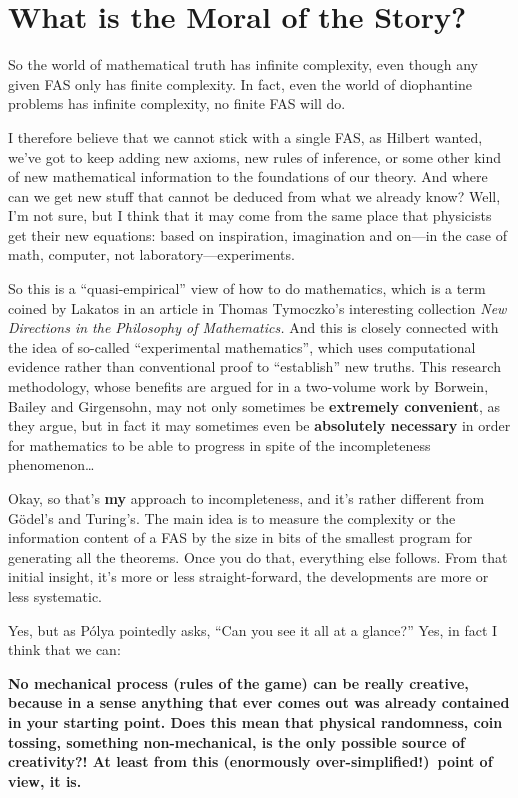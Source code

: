 \documentclass[12pt]{book}
\begin{document}
\section*{What is the Moral of the Story?}

So the world of mathematical truth has infinite complexity, even though any given FAS
only has finite complexity.  
In fact, even the world of diophantine problems has infinite complexity, no finite FAS will do.
 
I therefore believe that we cannot stick with a single FAS, as Hilbert wanted, we've
got to keep adding new axioms, new rules of inference, or some other kind of new mathematical
information to the foundations of our theory.  And where can we get new stuff that cannot
be deduced from what we already know?  Well, I'm not sure, but I think that it may come
from the same place that physicists get their new equations: based on inspiration, imagination and
on---in the case of math, computer, not laboratory---experiments.
 
So this is a ``quasi-empirical'' view of how to do mathematics, which is a term coined
by Lakatos in an article in Thomas Tymoczko's interesting collection \emph{New Directions in the
Philosophy of Mathematics.}  And this is closely connected 
with the idea of
so-called ``experimental mathematics'', 
which uses computational evidence rather than conventional proof to ``establish'' new truths.
This research methodology, whose benefits are 
argued for in a two-volume
work by Borwein, Bailey and Girgensohn,
may not only sometimes be \textbf{extremely convenient}, as they argue, but in fact 
it may sometimes even be \textbf{absolutely necessary} 
in order for mathematics to be able to progress
in spite of the incompleteness phenomenon\ldots
 
Okay, so that's \textbf{my} approach to incompleteness, and it's rather
different from G\"odel's and Turing's. The main idea is to measure
the complexity or the information content of a FAS by the size in bits of the smallest program
for generating all the theorems. Once you do that, everything else
follows. From that initial insight, it's more or less straight-forward, 
the developments are more or less systematic.
 
Yes, but as P\'olya pointedly asks, ``Can you 
see it all at a glance?''  Yes, in fact I think that we can:
 
\textbf{No mechanical process (rules of the game) can be really creative,
because in a sense anything that ever comes out was already
contained in your starting point. Does this mean that physical randomness,
coin tossing, something non-mechanical, is the only possible source of creativity?!
At least from this (enormously over-simplified!)\ point of view, it is.}
    
\end{document}
